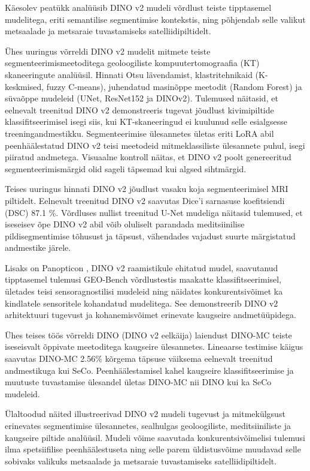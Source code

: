 Käesolev peatükk analüüsib DINO v2 mudeli võrdlust teiste tipptasemel mudelitega, eriti semantilise segmentimise kontekstis, ning põhjendab selle valikut metsaalade ja metsaraie tuvastamiseks satelliidipiltidelt.

Ühes uuringus võrreldi DINO v2 mudelit mitmete teiste segmenteerimismeetoditega
 geoloogiliste kompuutertomograafia (KT) skaneeringute analüüsil. Hinnati Otsu
 lävendamist, klastritehnikaid (K-keskmised, fuzzy C-means), juhendatud
 masinõppe meetodit (Random Forest) ja süvaõppe mudeleid (UNet, ResNet152 ja
 DINOv2). Tulemused näitasid, et eelnevalt treenitud DINO v2 demonstreeris
 tugevat jõudlust kivimipiltide klassifitseerimisel isegi siis, kui
 KT-skaneeringud ei kuulunud selle esialgsesse treeningandmestikku.
 Segmenteerimise ülesannetes ületas eriti LoRA abil peenhäälestatud DINO v2
 teisi meetodeid mitmeklassiliste ülesannete puhul, isegi piiratud andmetega.
 Visuaalne kontroll näitas, et DINO v2 poolt genereeritud segmenteerimismärgid
 olid sageli täpsemad kui algsed sihtmärgid. \cite{DINOv2RocksGeological}

Teises uuringus hinnati DINO v2 jõudlust vasaku koja segmenteerimisel MRI
 piltidelt. Eelnevalt treenitud DINO v2 saavutas Dice'i sarnasuse koefitsiendi
 (DSC)  87.1 \%. Võrdluses nullist treenitud U-Net
 mudeliga näitasid tulemused, et iseseisev õpe DINO v2 abil võib oluliselt
 parandada meditsiinilise pildisegmentimise tõhusust ja täpsust, vähendades
 vajadust suurte märgistatud andmestike järele. \cite{kunduAssessingPerformanceDINOv22024}

Lisaks on Panopticon , DINO v2 raamistikule ehitatud mudel, saavutanud
 tipptasemel tulemusi GEO-Bench võrdlustestis maakatte klassifitseerimisel,
 ületades teisi sensoragnostilisi mudeleid ning näidates konkurentsivõimet ka
 kindlatele sensoritele kohandatud mudelitega. See demonstreerib DINO v2
 arhitektuuri tugevust ja kohanemisvõimet erinevate kaugseire andmetüüpidega. \cite{PanopticonAdvancingAnySensor}

Ühes teises töös võrreldi DINO (DINO v2 eelkäija) laiendust DINO-MC teiste
iseseisvalt õppivate meetoditega kaugseire ülesannetes. Lineaarse testimise
käigus saavutas DINO-MC 2.56\% kõrgema täpsuse väiksema eelnevalt treenitud
andmestikuga kui SeCo. Peenhäälestamisel kahel kaugseire klassifitseerimise ja
muutuste tuvastamise ülesandel ületas DINO-MC nii DINO kui ka SeCo mudeleid. \cite{ExtendingGloballocalView}

Ülaltoodud näited illustreerivad DINO v2 mudeli tugevust ja mitmekülgsust
erinevates segmentimise ülesannetes, sealhulgas geoloogiliste, meditsiiniliste
ja kaugseire piltide analüüsil. Mudeli võime saavutada konkurentsivõimelisi
tulemusi ilma spetsiifilise peenhäälestuseta ning selle parem üldistusvõime
muudavad selle sobivaks valikuks metsaalade ja metsaraie tuvastamiseks
satelliidipiltidelt.